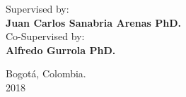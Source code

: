 \begin{center}
\large {Supervised by:}\\
\textbf{Juan Carlos Sanabria Arenas PhD.}\\
\vspace{0.5em}
\large {Co-Supervised by:}\\
\textbf{Alfredo Gurrola PhD.}
\end{center}

\vspace{1.5em}
\begin{center}
Bogotá, Colombia.\\
2018
\end{center}












